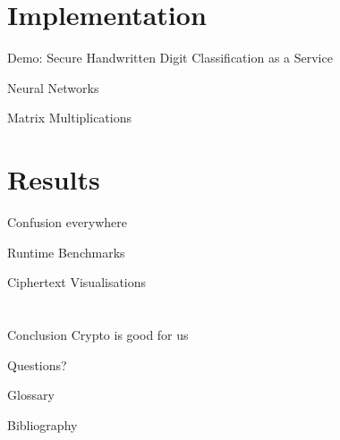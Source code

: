 \documentclass[aspectratio=169]{beamer}
\begin{document}
  \section{Implementation}
  \begin{frame}{Demo: Secure Handwritten Digit Classification as a Service}\end{frame}
  \begin{frame}{Neural Networks}\end{frame}
  \begin{frame}{Matrix Multiplications}\end{frame}
  \section{Results}
  \begin{frame}{Confusion everywhere}\end{frame}
  \begin{frame}{Runtime Benchmarks}\end{frame}
  \begin{frame}{Ciphertext Visualisations}\end{frame}

  \section*{}
  \begin{frame}{Conclusion}
    Crypto is good for us
  \end{frame}

  \begin{frame}[c]
    \centering
    \Large Questions?
  \end{frame}

  \begin{frame}[allowframebreaks]{Glossary}
    \printnoidxglossary[type=acronym]
  \end{frame}

  \begin{frame}[allowframebreaks]{Bibliography}
    \printbibliography
  \end{frame}
\end{document}
